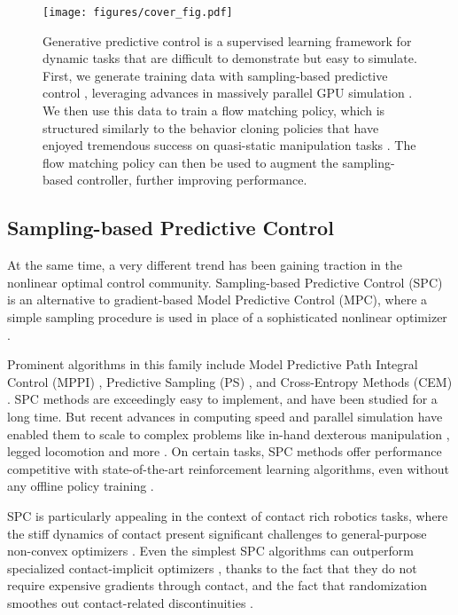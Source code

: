 \documentclass[letterpaper, 10 pt]{ieeeconf}
\begin{document}
\begin{figure}
    \centering
    \texttt{[image: figures/cover\_fig.pdf]}
    \caption{Generative predictive control is a supervised learning framework for dynamic tasks that are difficult to demonstrate but easy to simulate. First, we generate training data with sampling-based predictive control \cite{li2024drop, williams2016aggressive}, leveraging advances in massively parallel GPU simulation \cite{mjx, Genesis, makoviychuk2021isaac}. We then use this data to train a flow matching policy, which is structured similarly to the behavior cloning policies that have enjoyed tremendous success on quasi-static manipulation tasks \cite{chi2023diffusion, black2024pi_0}. The flow matching policy can then be used to augment the sampling-based controller, further improving performance.
    }
    \label{fig:hero}
\end{figure}

\subsection{Sampling-based Predictive Control}\label{sec:intro:spc}

At the same time, a very different trend has been gaining traction in the nonlinear optimal control community. Sampling-based Predictive Control (SPC) is an alternative to gradient-based Model Predictive Control (MPC), where a simple sampling procedure is used in place of a sophisticated nonlinear optimizer \cite{li2024drop}.

Prominent algorithms in this family include Model Predictive Path Integral Control (MPPI) \cite{williams2016aggressive}, Predictive Sampling (PS) \cite{howell2022predictive}, and Cross-Entropy Methods (CEM) \cite{rubinstein1999cross}. SPC methods are exceedingly easy to implement, and have been studied for a long time. But recent advances in computing speed and parallel simulation \cite{makoviychuk2021isaac, mjx, Genesis} have enabled them to scale to complex problems like in-hand dexterous manipulation \cite{li2024drop}, legged locomotion \cite{xue2024full} and more \cite{kurtz2024hydrax, howell2022predictive}. On certain tasks, SPC methods offer performance competitive with state-of-the-art reinforcement learning algorithms, even without any offline policy training \cite{li2024drop}.

SPC is particularly appealing in the context of contact rich robotics tasks, where the stiff dynamics of contact present significant challenges to general-purpose non-convex optimizers \cite{posa2014direct, kurtz2023inverse, erez2012trajectory, aydinoglu2024consensus}. Even the simplest SPC algorithms can outperform specialized contact-implicit optimizers \cite{howell2022predictive}, thanks to the fact that they do not require expensive gradients through contact, and the fact that randomization smoothes out contact-related discontinuities \cite{suh2022bundled, le2024leveraging}. 
\end{document}
